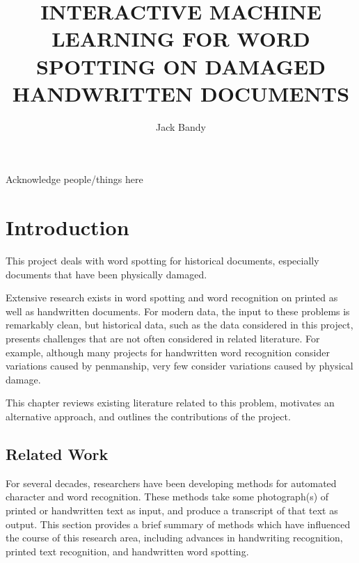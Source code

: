 \documentclass[final]{ukthesis}
\begin{document}
\author{Jack Bandy}
\title{INTERACTIVE MACHINE LEARNING FOR WORD SPOTTING ON DAMAGED HANDWRITTEN DOCUMENTS}
\frontmatter
\maketitle
\begin{acknowledgments}
Acknowledge people/things here
\end{acknowledgments}
\tableofcontents\clearpage
\listoffigures\clearpage
\listoftables\clearpage
\mainmatter


%
%
%
\chapter{Introduction}

This project deals with word spotting for historical documents, especially documents that have been physically damaged.

Extensive research exists in word spotting and word recognition on printed as well as handwritten documents. For modern data, the input to these problems is remarkably clean, but historical data, such as the data considered in this project, presents challenges that are not often considered in related literature. For example, although many projects for handwritten word recognition consider variations caused by penmanship, very few consider variations caused by physical damage.

This chapter reviews existing literature related to this problem, motivates an alternative approach, and outlines the contributions of the project.

%
%
\section{Related Work}
For several decades, researchers have been developing methods for automated character and word recognition. These methods take some photograph(s) of printed or handwritten text as input, and produce a transcript of that text as output. This section provides a brief summary of methods which have influenced the course of this research area, including advances in handwriting recognition, printed text recognition, and handwritten word spotting.
\end{document}
